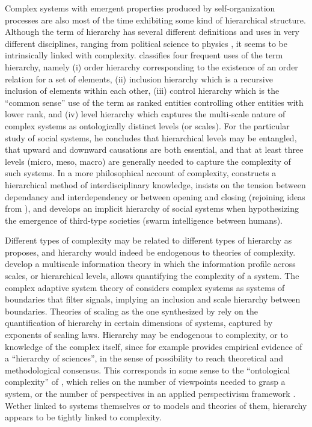 \documentclass[11pt]{article}
\begin{document}
Complex systems with emergent properties produced by self-organization processes are also most of the time exhibiting some kind of hierarchical structure. Although the term of hierarchy has several different definitions and uses in very different disciplines, ranging from political science \citep{crumley1987dialectical} to physics \citep{10.1371/journal.pone.0033799}, it seems to be intrinsically linked with complexity. \cite{lane2006hierarchy} classifies four frequent uses of the term hierarchy, namely (i) order hierarchy corresponding to the existence of an order relation for a set of elements, (ii) inclusion hierarchy which is a recursive inclusion of elements within each other, (iii) control hierarchy which is the ``common sense'' use of the term as ranked entities controlling other entities with lower rank, and (iv) level hierarchy which captures the multi-scale nature of complex systems as ontologically distinct levels (or scales). For the particular study of social systems, he concludes that hierarchical levels may be entangled, that upward and downward causations are both essential, and that at least three levels (micro, meso, macro) are generally needed to capture the complexity of such systems. In a more philosophical account of complexity, \cite{morin1980methode} constructs a hierarchical method of interdisciplinary knowledge, insists on the tension between dependancy and interdependency or between opening and closing (rejoining ideas from \cite{holland2012signals}), and develops an implicit hierarchy of social systems when hypothesizing the emergence of third-type societies (swarm intelligence between humans).

Different types of complexity may be related to different types of hierarchy as \cite{raimbault:halshs-02089520} proposes, and hierarchy would indeed be endogenous to theories of complexity. \cite{allen2017multiscale} develop a multiscale information theory in which the information profile across scales, or hierarchical levels, allows quantifying the complexity of a system. The complex adaptive system theory of \cite{holland2012signals} considers complex systems as systems of boundaries that filter signals, implying an inclusion and scale hierarchy between boundaries. Theories of scaling as the one synthesized by \cite{west2017scale} rely on the quantification of hierarchy in certain dimensions of systems, captured by exponents of scaling laws. Hierarchy may be endogenous to complexity, or to knowledge of the complex itself, since for example \cite{fanelli2013bibliometric} provides empirical evidence of a ``hierarchy of sciences'', in the sense of possibility to reach theoretical and methodological consensus. This corresponds in some sense to the ``ontological complexity'' of \cite{pumain2003approche}, which relies on the number of viewpoints needed to grasp a system, or the number of perspectives in an applied perspectivism framework \citep{raimbault2020relating}. Wether linked to systems themselves or to models and theories of them, hierarchy appears to be tightly linked to complexity.
\end{document}
